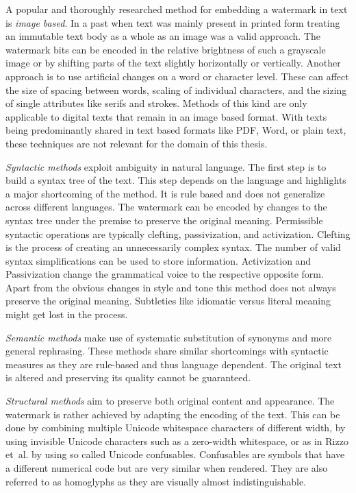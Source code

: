     A popular and thoroughly researched method for embedding a watermark in text is \emph{image based}.
    In a past when text was mainly present in printed form treating an immutable text body as a whole as an image was a valid approach.
    The watermark bits can be encoded in the relative brightness of such a grayscale image or by shifting parts of the text slightly horizontally or vertically.
    Another approach is to use artificial changes on a word or character level.
    These can affect the size of spacing between words, scaling of individual characters, and the sizing of single attributes like serifs and strokes.
    Methods of this kind are only applicable to digital texts that remain in an image based format.
    With texts being predominantly shared in text based formats like PDF, Word, or plain text, these techniques are not relevant for the domain of this thesis.

    \emph{Syntactic methods} exploit ambiguity in natural language.
    The first step is to build a syntax tree of the text.
    This step depends on the language and highlights a major shortcoming of the method.
    It is rule based and does not generalize across different languages.
    The watermark can be encoded by changes to the syntax tree under the premise to preserve the original meaning.
    Permissible syntactic operations are typically clefting, passivization, and activization.
    Clefting is the process of creating an unnecessarily complex syntax.
    The number of valid syntax simplifications can be used to store information.
    Activization and Passivization change the grammatical voice to the respective opposite form.
    Apart from the obvious changes in style and tone this method does not always preserve the original meaning.
    Subtleties like idiomatic versus literal meaning might get lost in the process.

    \emph{Semantic methods} make use of systematic substitution of synonyms and more general rephrasing.
    These methods share similar shortcomings with syntactic measures as they are rule-based and thus language dependent.
    The original text is altered and preserving its quality cannot be guaranteed.

    \emph{Structural methods} aim to preserve both original content and appearance.
    The watermark is rather achieved by adapting the encoding of the text.
    This can be done by combining multiple Unicode whitespace characters of different width, by using invisible Unicode characters such as a zero-width whitespace, or as in Rizzo et~al. \cite{rizzo2019finegrain} by using so called Unicode confusables.
    Confusables are symbols that have a different numerical code but are very similar when rendered.
    They are also referred to as homoglyphs as they are visually almost indistinguishable.

